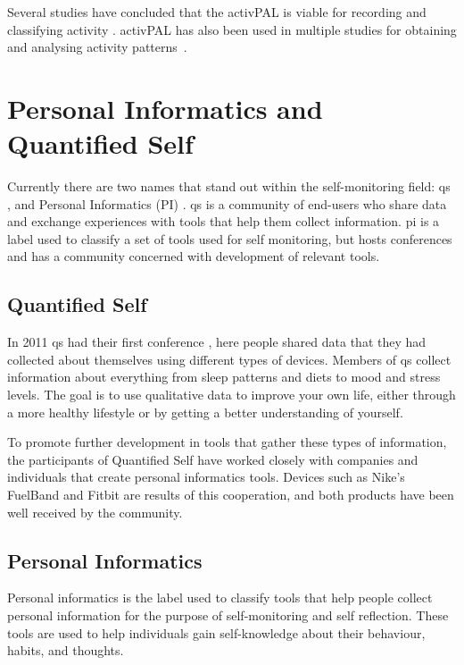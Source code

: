 Several studies have concluded that the activPAL is viable for recording and classifying activity \cite{grant2006, ryan2006, grant2008, tsavourelou}. activPAL has also been used in multiple studies for obtaining and analysing activity patterns~\cite{grant2010, lord, ryan2010}.

\section{Personal Informatics and Quantified Self}
Currently there are two names that stand out within the self-monitoring field: \gls{qs} \cite{quantifiedSelf}, and Personal Informatics (PI) \cite{personalInformatics}. \gls{qs} is a community of end-users who share data and exchange experiences with tools that help them collect information. \gls{pi} is a label used to classify a set of tools used for self monitoring, but hosts conferences and has a community concerned with development of relevant tools.

\subsection{Quantified Self}
In 2011 \gls{qs} had their first conference \cite{bodyHackers}, here people shared data that they had collected about themselves using different types of devices. Members of \gls{qs} collect information about everything from sleep patterns and diets to mood and stress levels. The goal is to use qualitative data to improve your own life, either through a more healthy lifestyle or by getting a better understanding of yourself. 

To promote further development in tools that gather these types of information, the participants of Quantified Self have worked closely with companies and individuals that create personal informatics tools. Devices such as Nike's FuelBand and Fitbit are results of this cooperation, and both products have been well received by the community.

\subsection{Personal Informatics}
Personal informatics is the label used to classify tools that help people collect personal information for the purpose of self-monitoring and self reflection. These tools are used to help individuals gain self-knowledge about their behaviour, habits, and thoughts.

